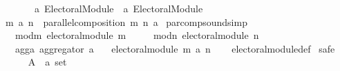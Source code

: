 \begin{isabellebody}
\ \ \ \ \ \ \ \ {\isacharprime}{\kern0pt}a\ Electoral{\isacharunderscore}{\kern0pt}Module\ {\isasymRightarrow}\ {\isacharprime}{\kern0pt}a\ Electoral{\isacharunderscore}{\kern0pt}Module{\isachardoublequoteclose}\isanewline
\ \ \ \ \ \ {\isacharparenleft}{\kern0pt}{\isachardoublequoteopen}{\isacharunderscore}{\kern0pt}\ {\isasymparallel}\isactrlsub {\isacharunderscore}{\kern0pt}\ {\isacharunderscore}{\kern0pt}{\isachardoublequoteclose}\ {\isacharbrackleft}{\kern0pt}{}{}{\isacharcomma}{\kern0pt}\ {}{}{}{}{\isacharcomma}{\kern0pt}\ {}{}{\isacharbrackright}{\kern0pt}\ {}{}{\isacharparenright}{\kern0pt}\ \isanewline
\ \ {\isachardoublequoteopen}m\ {\isasymparallel}\isactrlsub a\ n\ {\isacharequal}{\kern0pt}{\isacharequal}{\kern0pt}\ parallel{\isacharunderscore}{\kern0pt}composition\ m\ n\ a{\isachardoublequoteclose}%
\isadelimdocument
%
\endisadelimdocument
%
\isatagdocument
%
\isamarkuptrue%
%
\endisatagdocument
{\isafolddocument}%
%
\isadelimdocument
%
\endisadelimdocument
{}\isamarkupfalse%
\ par{\isacharunderscore}{\kern0pt}comp{\isacharunderscore}{\kern0pt}sound{\isacharbrackleft}{\kern0pt}simp{\isacharbrackright}{\kern0pt}{\isacharcolon}{\kern0pt}\isanewline
\ \ \isanewline
\ \ \ \ mod{\isacharunderscore}{\kern0pt}m{\isacharcolon}{\kern0pt}\ {\isachardoublequoteopen}electoral{\isacharunderscore}{\kern0pt}module\ m{\isachardoublequoteclose}\ \isanewline
\ \ \ \ mod{\isacharunderscore}{\kern0pt}n{\isacharcolon}{\kern0pt}\ {\isachardoublequoteopen}electoral{\isacharunderscore}{\kern0pt}module\ n{\isachardoublequoteclose}\ \isanewline
\ \ \ \ agg{\isacharunderscore}{\kern0pt}a{\isacharcolon}{\kern0pt}\ {\isachardoublequoteopen}aggregator\ a{\isachardoublequoteclose}\isanewline
\ \ \ {\isachardoublequoteopen}electoral{\isacharunderscore}{\kern0pt}module\ {\isacharparenleft}{\kern0pt}m\ {\isasymparallel}\isactrlsub a\ n{\isacharparenright}{\kern0pt}{\isachardoublequoteclose}\isanewline
%
\isadelimproof
\ \ %
\endisadelimproof
%
\isatagproof
{}\isamarkupfalse%
\ electoral{\isacharunderscore}{\kern0pt}module{\isacharunderscore}{\kern0pt}def\isanewline
{}\isamarkupfalse%
\ {\isacharparenleft}{\kern0pt}safe{\isacharparenright}{\kern0pt}\isanewline
\ \ \isamarkupfalse%
\isanewline
\ \ \ \ A\ {\isacharcolon}{\kern0pt}{\isacharcolon}{\kern0pt}\ {\isachardoublequoteopen}{\isacharprime}{\kern0pt}a\ set{\isachardoublequoteclose}\ \isanewline

\end{isabellebody}
